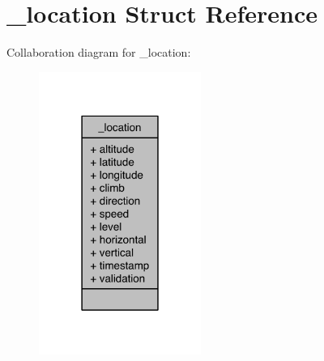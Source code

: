 \hypertarget{struct__location}{\section{\-\_\-location Struct Reference}
\label{struct__location}
}


Collaboration diagram for \-\_\-location\-:\nopagebreak
\begin{figure}[H]
\begin{center}
\leavevmode
\includegraphics[width=150pt]{d8/d44/struct__location__coll__graph}
\end{center}
\end{figure}
